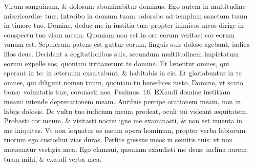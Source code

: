 \documentclass[a5paper,10pt]{book}
\def\ae{æ}
\begin{document}
\begin{multicols*}{2}
\newline \color{red} V\color{black}irum sanguinum, \& dolosum abominabitur dominus.
\newline \color{red} E\color{black}go autem in multitudine misericordi\ae \ tu\ae .
\newline \color{red} I\color{black}ntroibo in domum tuam: adorabo ad templum sanctum tuum in timore tuo.
\newline \color{red} D\color{black}omine, deduc me in iustitia tua: propter inimicos meos dirige in conspectu tuo viam meam.
\newline \color{red} Q\color{black}uoniam non est in ore eorum veritas: cor eorum vanum est.
\newline \color{red} S\color{black}epulcrum patens est guttur eorum, linguis suis dolose agebant, iudica illos deus.
\newline \color{red} D\color{black}ecidant a cogitationibus suis, secundum multitudinem impietatum eorum expelle eos, quoniam irritauerunt te domine.
\newline \color{red} E\color{black}t l\ae tentur omnes, qui sperant in te: in \ae ternum exsultabunt, \& habitabis in eis.
\newline \color{red} E\color{black}t gloriabuntur in te omnes, qui diligunt nomen tuum, quoniam tu benedices iusto.
\newline \color{red} D\color{black}omine, vt scuto bon\ae \ voluntatis tu\ae , coronasti nos. \quad \color{red} Psalmus. 16.\color{black}
\vspace{-1em}
\lettrine[lines=2]{\bfseries \color{red} E}{}Xaudi domine iustitiam meam: intende deprecationem meam.
\newline \color{red} A\color{black}uribus percipe orationem meam, non in labijs dolosis.
\newline \color{red} D\color{black}e vultu tuo iudicium meum prodeat, oculi tui videant \ae quitatem.%
\newline \color{red} P\color{black}robasti cor meum, \& visitasti nocte: igne me examinasti, \& non est inuenta in me iniquitas.
\newline \color{red} V\color{black}t non loquatur os meum opera hominum, propter verba labiorum tuorum ego custodiui vias duras.
\newline \color{red} P\color{black}erfice gressus meos in semitis tuis: vt non moueantur vestigia mea.
\newline \color{red} E\color{black}go clamaui, quoniam exaudisti me deus: inclina aurem tuam mihi, \& exaudi verba mea.

\end{multicols*}
\end{document}
